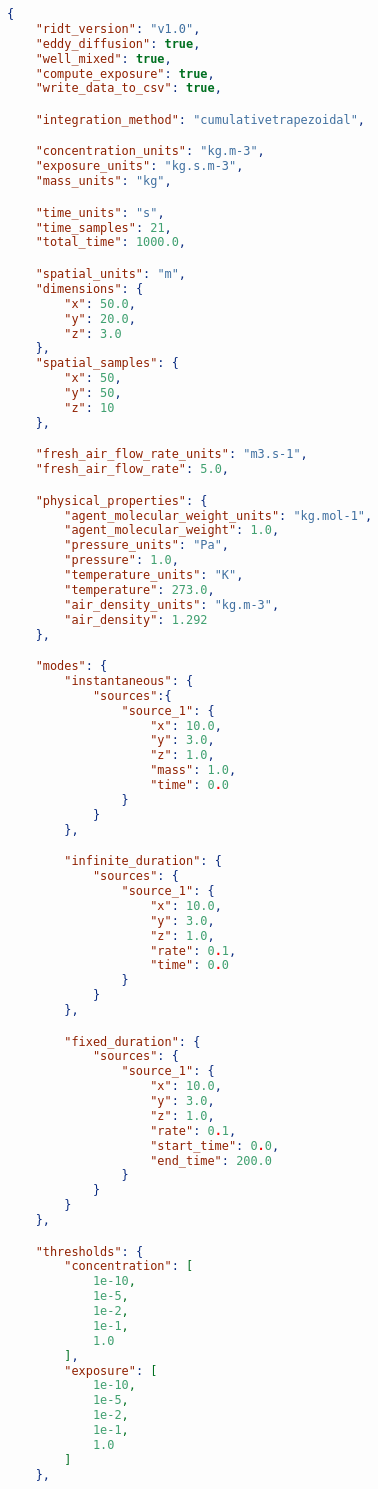 \begin{lstlisting}[language=json,firstnumber=1]
{
    "ridt_version": "v1.0",
    "eddy_diffusion": true,
    "well_mixed": true,
    "compute_exposure": true,
    "write_data_to_csv": true,

    "integration_method": "cumulativetrapezoidal",

    "concentration_units": "kg.m-3",
    "exposure_units": "kg.s.m-3",
    "mass_units": "kg",

    "time_units": "s",
    "time_samples": 21,
    "total_time": 1000.0,

    "spatial_units": "m",
    "dimensions": {
        "x": 50.0,
        "y": 20.0,
        "z": 3.0
    },
    "spatial_samples": {
        "x": 50,
        "y": 50,
        "z": 10 
    },

    "fresh_air_flow_rate_units": "m3.s-1",
    "fresh_air_flow_rate": 5.0,

    "physical_properties": {
        "agent_molecular_weight_units": "kg.mol-1",
        "agent_molecular_weight": 1.0,
        "pressure_units": "Pa",
        "pressure": 1.0,
        "temperature_units": "K",
        "temperature": 273.0,
        "air_density_units": "kg.m-3",
        "air_density": 1.292
    },

    "modes": {
        "instantaneous": {
            "sources":{
                "source_1": {
                    "x": 10.0,
                    "y": 3.0,
                    "z": 1.0,
                    "mass": 1.0,
                    "time": 0.0
                }
            }
        },

        "infinite_duration": {
            "sources": {
                "source_1": {
                    "x": 10.0,
                    "y": 3.0,
                    "z": 1.0,
                    "rate": 0.1,
                    "time": 0.0
                }
            }
        },

        "fixed_duration": {
            "sources": {
                "source_1": {
                    "x": 10.0,
                    "y": 3.0,
                    "z": 1.0,
                    "rate": 0.1,
                    "start_time": 0.0, 
                    "end_time": 200.0
                }
            }
        }
    },

    "thresholds": {
        "concentration": [
            1e-10,
            1e-5,
            1e-2,
            1e-1,
            1.0
        ],
        "exposure": [
            1e-10,
            1e-5,
            1e-2,
            1e-1,
            1.0
        ]
    },


\end{lstlisting}
